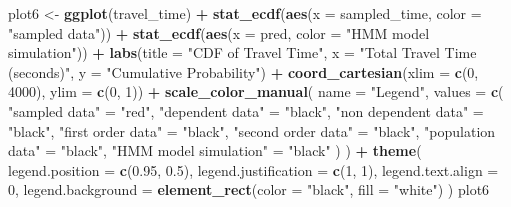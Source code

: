\documentclass[
]{article}
\newenvironment{Shaded}{\begin{snugshade}}{\end{snugshade}}
\newcommand{\AttributeTok}[1]{\textcolor[rgb]{0.13,0.29,0.53}{#1}}
\newcommand{\DecValTok}[1]{\textcolor[rgb]{0.00,0.00,0.81}{#1}}
\newcommand{\FloatTok}[1]{\textcolor[rgb]{0.00,0.00,0.81}{#1}}
\newcommand{\FunctionTok}[1]{\textcolor[rgb]{0.13,0.29,0.53}{\textbf{#1}}}
\newcommand{\NormalTok}[1]{#1}
\newcommand{\OtherTok}[1]{\textcolor[rgb]{0.56,0.35,0.01}{#1}}
\newcommand{\SpecialCharTok}[1]{\textcolor[rgb]{0.81,0.36,0.00}{\textbf{#1}}}
\newcommand{\StringTok}[1]{\textcolor[rgb]{0.31,0.60,0.02}{#1}}
\begin{document}
\begin{Shaded}
\begin{Highlighting}[]
\NormalTok{plot6 }\OtherTok{\textless{}{-}} \FunctionTok{ggplot}\NormalTok{(travel\_time) }\SpecialCharTok{+}
  \FunctionTok{stat\_ecdf}\NormalTok{(}\FunctionTok{aes}\NormalTok{(}\AttributeTok{x =}\NormalTok{ sampled\_time, }\AttributeTok{color =} \StringTok{"sampled data"}\NormalTok{)) }\SpecialCharTok{+}
  \FunctionTok{stat\_ecdf}\NormalTok{(}\FunctionTok{aes}\NormalTok{(}\AttributeTok{x =}\NormalTok{ pred, }\AttributeTok{color =} \StringTok{"HMM model simulation"}\NormalTok{)) }\SpecialCharTok{+}
  \FunctionTok{labs}\NormalTok{(}\AttributeTok{title =} \StringTok{"CDF of Travel Time"}\NormalTok{, }\AttributeTok{x =} \StringTok{"Total Travel Time (seconds)"}\NormalTok{, }\AttributeTok{y =} \StringTok{"Cumulative Probability"}\NormalTok{) }\SpecialCharTok{+}
  \FunctionTok{coord\_cartesian}\NormalTok{(}\AttributeTok{xlim =} \FunctionTok{c}\NormalTok{(}\DecValTok{0}\NormalTok{, }\DecValTok{4000}\NormalTok{), }\AttributeTok{ylim =} \FunctionTok{c}\NormalTok{(}\DecValTok{0}\NormalTok{, }\DecValTok{1}\NormalTok{)) }\SpecialCharTok{+}
  \FunctionTok{scale\_color\_manual}\NormalTok{(}
    \AttributeTok{name =} \StringTok{"Legend"}\NormalTok{,}
    \AttributeTok{values =} \FunctionTok{c}\NormalTok{(}
      \StringTok{"sampled data"} \OtherTok{=} \StringTok{"red"}\NormalTok{,}
      \StringTok{"dependent data"} \OtherTok{=} \StringTok{"black"}\NormalTok{,}
      \StringTok{"non dependent data"} \OtherTok{=} \StringTok{"black"}\NormalTok{,}
      \StringTok{"first order data"} \OtherTok{=} \StringTok{"black"}\NormalTok{,}
      \StringTok{"second order data"} \OtherTok{=} \StringTok{"black"}\NormalTok{,}
      \StringTok{"population data"} \OtherTok{=} \StringTok{"black"}\NormalTok{,}
      \StringTok{"HMM model simulation"} \OtherTok{=} \StringTok{"black"}
\NormalTok{    )}
\NormalTok{  ) }\SpecialCharTok{+}
  \FunctionTok{theme}\NormalTok{(}
    \AttributeTok{legend.position =} \FunctionTok{c}\NormalTok{(}\FloatTok{0.95}\NormalTok{, }\FloatTok{0.5}\NormalTok{),}
    \AttributeTok{legend.justification =} \FunctionTok{c}\NormalTok{(}\DecValTok{1}\NormalTok{, }\DecValTok{1}\NormalTok{),}
    \AttributeTok{legend.text.align =} \DecValTok{0}\NormalTok{,}
    \AttributeTok{legend.background =} \FunctionTok{element\_rect}\NormalTok{(}\AttributeTok{color =} \StringTok{"black"}\NormalTok{, }\AttributeTok{fill =} \StringTok{"white"}\NormalTok{)}
\NormalTok{  )}
\NormalTok{plot6}
\end{Highlighting}
\end{Shaded}
\end{document}
